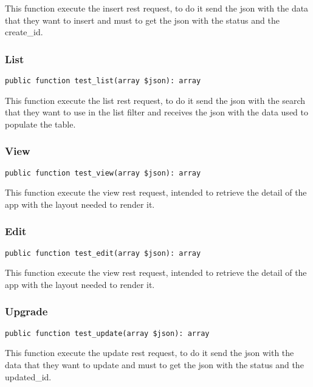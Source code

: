 \documentclass[a4paper]{article}
\begin{document}
This function execute the insert rest request, to do it send the json with
the data that they want to insert and must to get the json with the status
and the create\_id.

\hypertarget{toc26}{}
\subsubsection{List}

\begin{lstlisting}
public function test_list(array $json): array
\end{lstlisting}

This function execute the list rest request, to do it send the json with
the search that they want to use in the list filter and receives the json
with the data used to populate the table.

\hypertarget{toc27}{}
\subsubsection{View}

\begin{lstlisting}
public function test_view(array $json): array
\end{lstlisting}

This function execute the view rest request, intended to retrieve the detail
of the app with the layout needed to render it.

\hypertarget{toc28}{}
\subsubsection{Edit}

\begin{lstlisting}
public function test_edit(array $json): array
\end{lstlisting}

This function execute the view rest request, intended to retrieve the detail
of the app with the layout needed to render it.

\hypertarget{toc29}{}
\subsubsection{Upgrade}

\begin{lstlisting}
public function test_update(array $json): array
\end{lstlisting}

This function execute the update rest request, to do it send the json with
the data that they want to update and must to get the json with the status
and the updated\_id.
\end{document}
